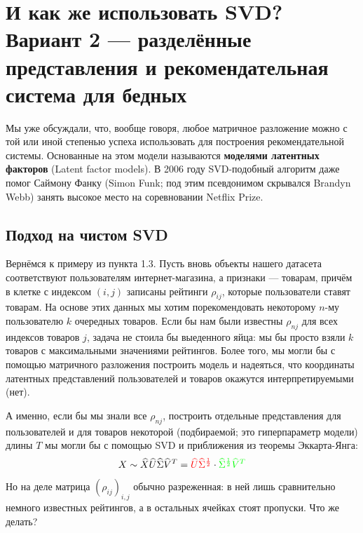 \documentclass{amsart}
\theoremstyle{definition}
\theoremstyle{remark}
\numberwithin{equation}{section}
\begin{document}
\section{И как же использовать SVD? Вариант 2 --- разделённые представления и рекомендательная система для бедных}

Мы уже обсуждали, что, вообще говоря, любое матричное разложение можно с той или иной степенью успеха использовать для построения рекомендательной системы. Основанные на этом модели называются \textbf{моделями латентных факторов} (Latent factor models). В 2006 году SVD-подобный алгоритм даже помог Саймону Фанку (Simon Funk; под этим псевдонимом скрывался Brandyn Webb) занять высокое место на соревновании Netflix Prize.

\subsection{Подход на чистом SVD}

Вернёмся к примеру из пункта 1.3. Пусть вновь объекты нашего датасета соответствуют пользователям интернет-магазина, а признаки --- товарам, причём в клетке с индексом $(i,j)$ записаны рейтинги $\rho_{ij}$, которые пользователи ставят товарам. На основе этих данных мы хотим порекомендовать некоторому $n$-му пользователю $k$ очередных товаров. Если бы нам были известны $\rho_{nj}$ для всех индексов товаров $j$, задача не стоила бы выеденного яйца: мы бы просто взяли $k$ товаров с максимальными значениями рейтингов. Более того, мы могли бы с помощью матричного разложения построить модель и надеяться, что координаты латентных представлений пользователей и товаров окажутся интерпретируемыми (нет).
\begin{center}
\end{center}

А именно, если бы мы знали все $\rho_{nj}$, построить отдельные представления для пользователей и для товаров некоторой (подбираемой; это гиперпараметр модели) длины $T$ мы могли бы с помощью SVD и приближения из теоремы Эккарта-Янга:
$$X\sim\widehat{X}\widehat{U}\widehat{\Sigma}\widehat{V}^T = \textcolor{red}{\widehat{U}\widehat{\Sigma}^{\frac12}}\cdot
\textcolor{green}{\widehat{\Sigma}^{\frac12}\widehat{V}^T}$$

Но на деле матрица $\left(\rho_{ij}\right)_{i,j}$ обычно разреженная: в ней лишь сравнительно немного известных рейтингов, а в остальных ячейках стоят пропуски. Что же делать?
\end{document}
